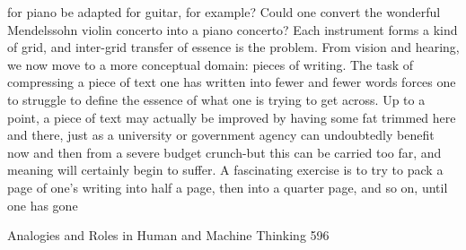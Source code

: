 for piano be adapted for guitar, for example? Could one convert the wonderful
Mendelssohn violin concerto into a piano concerto? Each instrument forms a kind of
grid, and inter-grid transfer of essence is the problem.
        From vision and hearing, we now move to a more conceptual domain: pieces
of writing. The task of compressing a piece of text one has written into fewer and
fewer words forces one to struggle to define the essence of what one is trying to get
across. Up to a point, a piece of text may actually be improved by having some fat
trimmed here and there, just as a university or government agency can undoubtedly
benefit now and then from a severe budget crunch-but this can be carried too far, and
meaning will certainly begin to suffer. A fascinating exercise is to try to pack a page
of one's writing into half a page, then into a quarter page, and so on, until one has
gone




Analogies and Roles in Human and Machine Thinking                                   596

